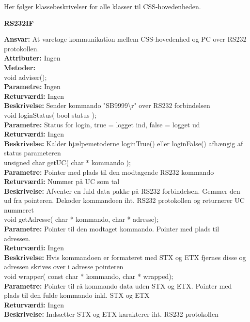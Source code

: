 Her følger klassebeskrivelser for alle klasser til CSS-hovedenheden. \\

%
%
{\centering
\textbf{RS232IF}\par
}
\textbf{Ansvar:} At varetage kommunikation mellem CSS-hovedenhed og PC over RS232 protokollen. \\
\textbf{Attributer:} Ingen \\
\textbf{Metoder:} \\
void adviser(); \\
\textbf{Parametre:} Ingen \\
\textbf{Returværdi:} Ingen \\
\textbf{Beskrivelse:} Sender kommando "SB9999\textbackslash r" over RS232 forbindelsen \\

void loginStatus( bool status ); \\
\textbf{Parametre:} Status for login, true = logget ind, false = logget ud  \\
\textbf{Returværdi:} Ingen \\
\textbf{Beskrivelse:} Kalder hjælpemetoderne loginTrue() eller loginFalse() afhængig af status parameteren \\

unsigned char getUC( char * kommando ); \\
\textbf{Parametre:} Pointer med plads til den modtagende RS232 kommando \\
\textbf{Returværdi:} Nummer på UC som tal \\
\textbf{Beskrivelse:} Afventer en fuld data pakke på RS232-forbindelsen. Gemmer den ud fra pointeren. Dekoder kommandoen iht. RS232 protokollen og returnerer UC nummeret \\

void getAdresse( char * kommando, char * adresse); \\
\textbf{Parametre:} Pointer til den modtaget kommando. Pointer med plads til adressen. \\
\textbf{Returværdi:} Ingen \\
\textbf{Beskrivelse:} Hvis kommandoen er formateret med STX og ETX fjernes disse og adressen skrives over i adresse pointeren \\

void wrapper( const char * kommando, char * wrapped); \\
\textbf{Parametre:} Pointer til rå kommando data uden STX og ETX. Pointer med plads til den fulde kommando inkl. STX og ETX \\
\textbf{Returværdi:} Ingen \\
\textbf{Beskrivelse:} Indsætter STX og ETX karakterer iht. RS232 protokollen\\

